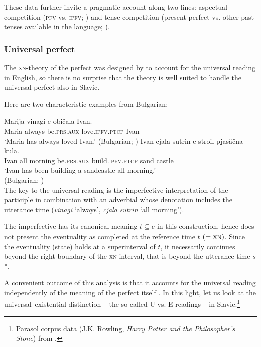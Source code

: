 \documentclass[output=paper,colorlinks,citecolor=brown]{langscibook}
\begin{document}
These data further invite a  pragmatic account along two lines: aspectual competition (\textsc{pfv} vs. \textsc{ipfv}; \citealt{gronndiss}) and tense competition (present perfect vs. other past tenses available in the language; \citealt{zhao22}). 

\subsubsection{Universal perfect}

The \textsc{xn}-theory of the perfect was designed by \citet{Dowty1979} to account for the universal reading in English, so there is no surprise that the theory is well suited to handle the universal perfect also in Slavic.

Here are two characteristic examples from Bulgarian:

\ea\ea\gll
  Marija vinagi e običala Ivan. \\
Maria always be.\textsc{prs}.\textsc{aux} love.\textsc{ipfv}.\textsc{ptcp} Ivan\\ 
\glt
`Maria has always loved Ivan.' \hfill (Bulgarian; \cite[172]{iatridou01})
\ex\gll Ivan cjala sutrin e stroil pjasăčna kula. \\
Ivan all morning be.\textsc{prs}.\textsc{aux} build.\textsc{ipfv}.\textsc{ptcp} sand castle \\
\glt
`Ivan has been building a sandcastle all morning.'\\ \hfill (Bulgarian; \cite[296]{pancheva03})\\
\z\z
The key to the universal reading is the imperfective interpretation of the participle in combination with an adverbial whose denotation includes the utterance time (\textit{vinagi} `always', \textit{cjala} \textit{sutrin} `all morning').

The imperfective has its canonical meaning $t \subseteq e$ in this construction, hence does not present the eventuality 
as completed at the reference time $t$ $(=\textsc{xn})$. Since the eventuality (state) holds at a superinterval of $t$, it necessarily continues beyond the right boundary of the \textsc{xn}-interval, that is beyond the utterance time $s$*.

A convenient outcome of this analysis is that it accounts for the universal reading
 independently of the meaning of the perfect itself \citep{pancheva03}. 
In this light, let us look at the universal--existential-distinction -- the so-called U vs. E-readings -- in Slavic.\footnote{Parasol corpus data (J.K. Rowling, \textit{Harry Potter and the Philosopher's Stone}) from \citet{gronn_stechow2020}.}
\end{document}
